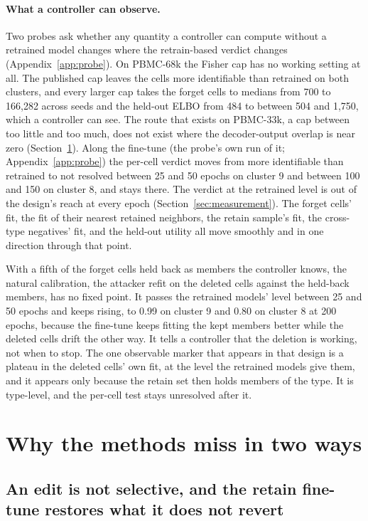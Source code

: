 \documentclass{article}
\begin{document}
\paragraph{What a controller can observe.} Two probes ask whether any quantity a controller can compute without a retrained model changes where the retrain-based verdict changes (Appendix~\ref{app:probe}). On PBMC-68k the Fisher cap has no working setting at all. The published cap leaves the cells more identifiable than retrained on both clusters, and every larger cap takes the forget cells to medians from 700 to 166,282 across seeds and the held-out ELBO from 484 to between 504 and 1,750, which a controller can see. The route that exists on PBMC-33k, a cap between too little and too much, does not exist where the decoder-output overlap is near zero (Section~\ref{sec:mechanisms}). Along the fine-tune (the probe's own run of it; Appendix~\ref{app:probe}) the per-cell verdict moves from more identifiable than retrained to not resolved between 25 and 50 epochs on cluster 9 and between 100 and 150 on cluster 8, and stays there. The verdict at the retrained level is out of the design's reach at every epoch (Section~\ref{sec:measurement}). The forget cells' fit, the fit of their nearest retained neighbors, the retain sample's fit, the cross-type negatives' fit, and the held-out utility all move smoothly and in one direction through that point.

With a fifth of the forget cells held back as members the controller knows, the natural calibration, the attacker refit on the deleted cells against the held-back members, has no fixed point. It passes the retrained models' level between 25 and 50 epochs and keeps rising, to 0.99 on cluster 9 and 0.80 on cluster 8 at 200 epochs, because the fine-tune keeps fitting the kept members better while the deleted cells drift the other way. It tells a controller that the deletion is working, not when to stop. The one observable marker that appears in that design is a plateau in the deleted cells' own fit, at the level the retrained models give them, and it appears only because the retain set then holds members of the type. It is type-level, and the per-cell test stays unresolved after it.

\section{Why the methods miss in two ways}
\label{sec:mechanisms}

\subsection{An edit is not selective, and the retain fine-tune restores what it does not revert}
\end{document}
